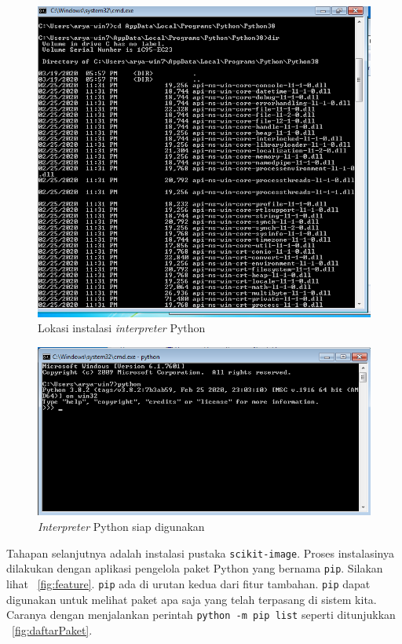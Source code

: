 \begin{figure}[h!]
  \begin{center}
    \includegraphics[scale=.5]{pics/installedLocation.png}
    \caption{Lokasi instalasi \textit{interpreter} Python}
    \label{fig:lokasi}
  \end{center}
\end{figure}

\begin{figure}[h!]
  \begin{center}
    \includegraphics[scale=.5]{pics/pythonAktif.png}
    \caption{\textit{Interpreter} Python siap digunakan}
    \label{fig:siap}
  \end{center}
\end{figure}

Tahapan selanjutnya adalah instalasi pustaka \texttt{scikit-image}. Proses instalasinya dilakukan dengan aplikasi pengelola paket Python yang bernama \texttt{pip}. Silakan lihat \figurename~\ref{fig:feature}. \texttt{pip} ada di urutan kedua dari fitur tambahan. \texttt{pip} dapat digunakan untuk melihat paket apa saja yang telah terpasang di sistem kita. Caranya dengan menjalankan perintah \texttt{python -m pip list} seperti ditunjukkan \figurename~\ref{fig:daftarPaket}.

